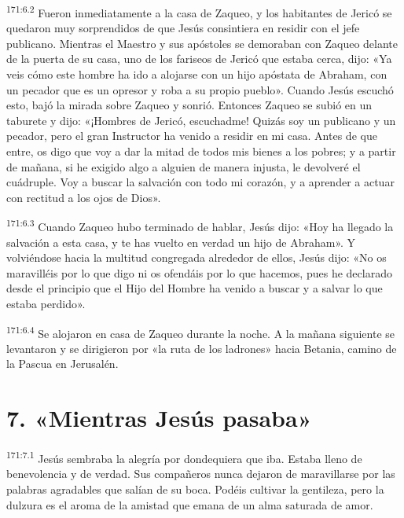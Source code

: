 \par 
\textsuperscript{171:6.2} Fueron inmediatamente a la casa de Zaqueo, y los habitantes de Jericó se quedaron muy sorprendidos de que Jesús consintiera en residir con el jefe publicano. Mientras el Maestro y sus apóstoles se demoraban con Zaqueo delante de la puerta de su casa, uno de los fariseos de Jericó que estaba cerca, dijo: «Ya veis cómo este hombre ha ido a alojarse con un hijo apóstata de Abraham, con un pecador que es un opresor y roba a su propio pueblo». Cuando Jesús escuchó esto, bajó la mirada sobre Zaqueo y sonrió. Entonces Zaqueo se subió en un taburete y dijo: «¡Hombres de Jericó, escuchadme! Quizás soy un publicano y un pecador, pero el gran Instructor ha venido a residir en mi casa. Antes de que entre, os digo que voy a dar la mitad de todos mis bienes a los pobres; y a partir de mañana, si he exigido algo a alguien de manera injusta, le devolveré el cuádruple. Voy a buscar la salvación con todo mi corazón, y a aprender a actuar con rectitud a los ojos de Dios».

\par 
\textsuperscript{171:6.3} Cuando Zaqueo hubo terminado de hablar, Jesús dijo: «Hoy ha llegado la salvación a esta casa, y te has vuelto en verdad un hijo de Abraham». Y volviéndose hacia la multitud congregada alrededor de ellos, Jesús dijo: «No os maravilléis por lo que digo ni os ofendáis por lo que hacemos, pues he declarado desde el principio que el Hijo del Hombre ha venido a buscar y a salvar lo que estaba perdido».

\par 
\textsuperscript{171:6.4} Se alojaron en casa de Zaqueo durante la noche. A la mañana siguiente se levantaron y se dirigieron por «la ruta de los ladrones» hacia Betania, camino de la Pascua en Jerusalén.

\section*{7. «Mientras Jesús pasaba»}
\par 
\textsuperscript{171:7.1} Jesús sembraba la alegría por dondequiera que iba. Estaba lleno de benevolencia y de verdad. Sus compañeros nunca dejaron de maravillarse por las palabras agradables que salían de su boca. Podéis cultivar la gentileza, pero la dulzura es el aroma de la amistad que emana de un alma saturada de amor.

